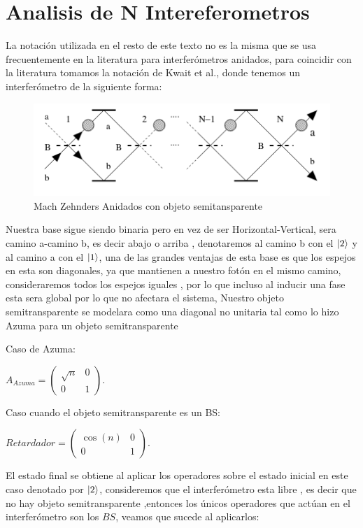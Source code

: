 \documentclass[11pt]{article}
\begin{document}
 \section{Analisis de N Intereferometros }
 
 La notación utilizada en el resto de este texto no es la misma que se usa frecuentemente en la literatura para interferómetros anidados, para coincidir con la literatura tomamos la notación de Kwait et al.\cite{5}, donde tenemos un interferómetro de la siguiente forma:
 
\begin{figure}[h!]
\centering
\includegraphics[width=\linewidth]{baseAzuma.png}
\caption{Mach Zehnders Anidados con objeto semitansparente}
\label{fig:BS2}
\end{figure}
 
 Nuestra base sigue siendo binaria pero en vez de ser Horizontal-Vertical, sera camino a-camino b, es decir abajo o arriba , denotaremos al camino b con el $\ket{2}$  y al camino a con el $\ket{1}$, una de las grandes ventajas de esta base es que los espejos en esta son diagonales, ya que mantienen a nuestro fotón en el mismo camino, consideraremos todos los espejos iguales , por lo que incluso al inducir una fase esta sera global por lo que no afectara el sistema, Nuestro objeto semitransparente se modelara como una diagonal no unitaria tal como lo hizo Azuma \cite{9} para un objeto semitransparente 
 
 Caso de Azuma:
 
  $A_{Azuma}=\begin
{pmatrix} \sqrt{n} & 0\\0& 1\end
{pmatrix}$.

Caso cuando el objeto semitransparente es un BS:

 $Retardador=\begin
{pmatrix} \cos(n) & 0\\0& 1\end
{pmatrix}$.

El estado final se obtiene al aplicar los operadores sobre el estado inicial en este caso denotado por $\ket{2}$, consideremos que el interferómetro esta libre , es decir que no hay objeto semitransparente ,entonces los únicos operadores que actúan en el interferómetro son los $BS$, veamos que sucede al aplicarlos:
\end{document}
